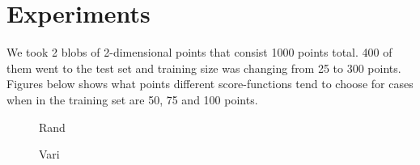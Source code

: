 \documentclass[a4paper]{article}
\begin{document}
\section{Experiments}

We took 2 blobs of 2-dimensional points that consist 1000 points total. 400 of them went to the test set and training size was changing from 25 to 300 points. Figures below shows what points different score-functions tend to choose for cases when in the training set are 50, 75 and 100 points.

\begin{figure}[h]
\begin{minipage}[h]{0.49\linewidth}
 Rand
\end{minipage}
\hfill
\begin{minipage}[h]{0.49\linewidth}
 Vari
\end{minipage}
\vfill
\begin{minipage}[h]{0.49\linewidth}

\end{minipage}
\end{figure}
\end{document}
